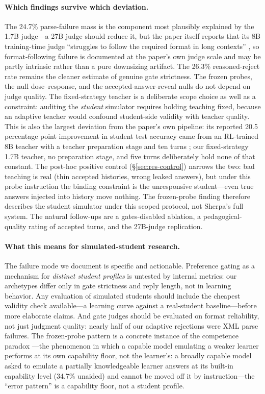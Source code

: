 \documentclass[notitlepage,12pt]{jedm}
\begin{document}
\paragraph{Which findings survive which deviation.} The 24.7\% parse-failure
mass is the component most plausibly explained by the 1.7B judge---a 27B
judge should reduce it, but the paper itself reports that its 8B
training-time judge ``struggles to follow the required format in long
contexts'' \citep{xu2026sherpa}, so format-following failure is documented
at the paper's own judge scale and may be partly intrinsic rather than a
pure downsizing artifact. The 26.3\% reasoned-reject rate remains the
cleaner estimate of genuine gate strictness. The frozen probes, the null
dose--response, and the accepted-answer-reveal nulls do not depend on judge
quality. The fixed-strategy teacher is a deliberate scope choice as well as
a constraint: auditing the \emph{student} simulator requires holding
teaching fixed, because an adaptive teacher would confound student-side
validity with teacher quality. This is also the largest deviation from the
paper's own pipeline: its reported 20.5 percentage point improvement in
student test accuracy came from an RL-trained 8B teacher with a teacher
preparation stage and ten turns \citep{xu2026sherpa}; our fixed-strategy 1.7B
teacher, no preparation stage, and five turns deliberately hold none of that
constant. The post-hoc positive control (\S\ref{sec:res-control}) narrows
the two: bad teaching is real (thin accepted histories, wrong leaked
answers), but under this probe instruction the binding constraint is the
unresponsive student---even true answers injected into history move
nothing. The frozen-probe finding
therefore describes the student simulator under this scoped protocol, not
Sherpa's full system. The natural
follow-ups are a gates-disabled ablation, a pedagogical-quality rating of
accepted turns, and the 27B-judge replication.

\paragraph{What this means for simulated-student research.} The failure mode
we document is specific and actionable. Preference gating as a mechanism for
\emph{distinct student profiles} is untested by internal metrics: our
archetypes differ only in gate strictness and reply length, not in learning
behavior. Any evaluation of simulated students should include the cheapest
validity check available---a learning curve against a real-student
baseline---before more elaborate claims. And gate judges should be evaluated
on format reliability, not just judgment quality: nearly half of our adaptive
rejections were XML parse failures. The frozen-probe pattern is a concrete
instance of the competence paradox \citep{yuan2026}---the phenomenon in
which a capable model emulating a weaker learner performs at its own
capability floor, not the learner's: a broadly capable
model asked to emulate a partially knowledgeable learner answers at its
built-in capability level (34.7\% unaided) and cannot be moved off it by
instruction---the ``error pattern'' is a capability floor, not a student
profile.
\end{document}
